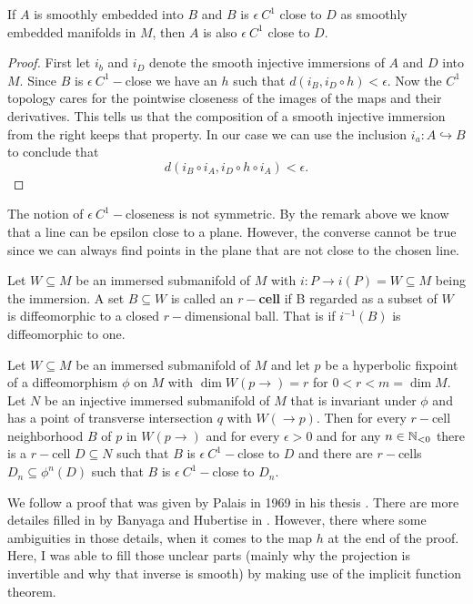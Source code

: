 \begin{corollary}\label{cor: Subspaces are also close}
If $A$ is smoothly embedded into $B$ and $B$ is $\epsilon~C^1$ close to $D$ as smoothly embedded manifolds in $M$, then $A$ is also $\epsilon~C^1$ close to $D$.
\end{corollary}
\begin{proof} First let $i_b$ and $i_D$ denote the smooth injective immersions of $A$ and $D$ into $M$.
Since $B$ is $\epsilon~C^1-$close we have an $h$ such that $d(i_B,i_D\circ h)<\epsilon$. Now the $C^1$ topology cares for the pointwise closeness of the images of the maps and their derivatives. This tells us that the composition of a smooth injective immersion from the right keeps that property. In our case we can use the inclusion $i_a: A \hookrightarrow B$ to conclude that $$d(i_B\circ i_A,i_D\circ h\circ i_A)<\epsilon.$$
\end{proof}
\begin{remark}
The notion of $\epsilon~C^1-$closeness is not symmetric. By the remark above we know that a line can be epsilon close to a plane. However, the converse cannot be true since we can always find points in the plane that are not close to the chosen line. 
\end{remark}
\begin{definition}[$r-$cell]
Let $W\subseteq M$ be an immersed submanifold of $M$ with ${i:P\to i(P)=W\subseteq M}$ being the immersion. A set $B\subseteq W$ is called an \textbf{$r-$cell} if B regarded as a subset of $W$ is diffeomorphic to a closed $r-$dimensional ball. That is if $i^{-1}(B)$ is diffeomorphic to one.     
\end{definition}
\begin{theorem}\label{thm: lambda Lemma}
    Let $W\subseteq M$ be an immersed submanifold of $M$ and let $p$ be a hyperbolic fixpoint of a diffeomorphism $\phi$ on $M$ with $\dim W(p \to)=r$ for ${0<r<m=\dim M}$. Let $N$ be an injective immersed submanifold of $M$ that is invariant under $\phi$ and has a point of transverse intersection $q$ with $W(\to p)$. Then for every $r-$cell neighborhood $B$ of $p$ in $W(p \to )$ and for every $\epsilon >0$ and for any $n\in \mathbb{N}_{<0}$ there is a $r-$cell $D\subseteq N$ such that $B$ is $\epsilon~C^1-$close to $D$ and there are $r-$cells $D_n\subseteq \phi^n(D)$ such that $B$ is $\epsilon~C^1-$close to $D_n$. 
\end{theorem}
\begin{remark}
We follow a proof that was given by Palais in 1969 in his thesis \cite{PalaisLambdalemma}. There are more detailes filled in by Banyaga and Hubertise in \cite{LecturesonMorseHomology}. However, there where some ambiguities in those details, when it comes to the map $h$ at the end of the proof. Here, I was able to fill those unclear parts (mainly why the projection is invertible and why that inverse is smooth) by making use of the implicit function theorem. 
\end{remark}

